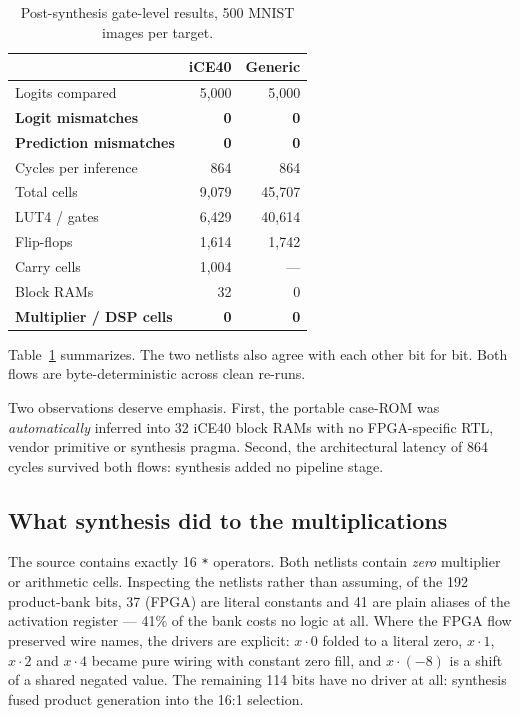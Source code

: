 \documentclass[conference]{IEEEtran}
\begin{document}
\begin{table}[h]
\centering
\caption{Post-synthesis gate-level results, 500 MNIST images per target.}
\label{tab:gls}
\begin{tabular}{lrr}
\toprule
& iCE40 & Generic \\
\midrule
Logits compared & 5{,}000 & 5{,}000 \\
\textbf{Logit mismatches} & \textbf{0} & \textbf{0} \\
\textbf{Prediction mismatches} & \textbf{0} & \textbf{0} \\
Cycles per inference & 864 & 864 \\
\midrule
Total cells & 9{,}079 & 45{,}707 \\
LUT4 / gates & 6{,}429 & 40{,}614 \\
Flip-flops & 1{,}614 & 1{,}742 \\
Carry cells & 1{,}004 & --- \\
Block RAMs & 32 & 0 \\
\textbf{Multiplier / DSP cells} & \textbf{0} & \textbf{0} \\
\bottomrule
\end{tabular}
\end{table}

Table~\ref{tab:gls} summarizes. The two netlists also agree with each other bit
for bit. Both flows are byte-deterministic across clean re-runs.

Two observations deserve emphasis. First, the portable case-ROM was
\emph{automatically} inferred into 32 iCE40 block RAMs with no FPGA-specific
RTL, vendor primitive or synthesis pragma. Second, the architectural latency of
864 cycles survived both flows: synthesis added no pipeline stage.

\subsection{What synthesis did to the multiplications}
\label{sec:constmul}

The source contains exactly 16 \texttt{*} operators. Both netlists contain
\emph{zero} multiplier or arithmetic cells. Inspecting the netlists rather than
assuming, of the 192 product-bank bits, 37 (FPGA) are literal constants and 41
are plain aliases of the activation register --- 41\% of the bank costs no
logic at all. Where the FPGA flow preserved wire names, the drivers are
explicit: $x{\cdot}0$ folded to a literal zero, $x{\cdot}1$, $x{\cdot}2$ and
$x{\cdot}4$ became pure wiring with constant zero fill, and $x{\cdot}(-8)$ is a
shift of a shared negated value. The remaining 114 bits have no driver at all:
synthesis fused product generation into the 16:1 selection.
\end{document}
